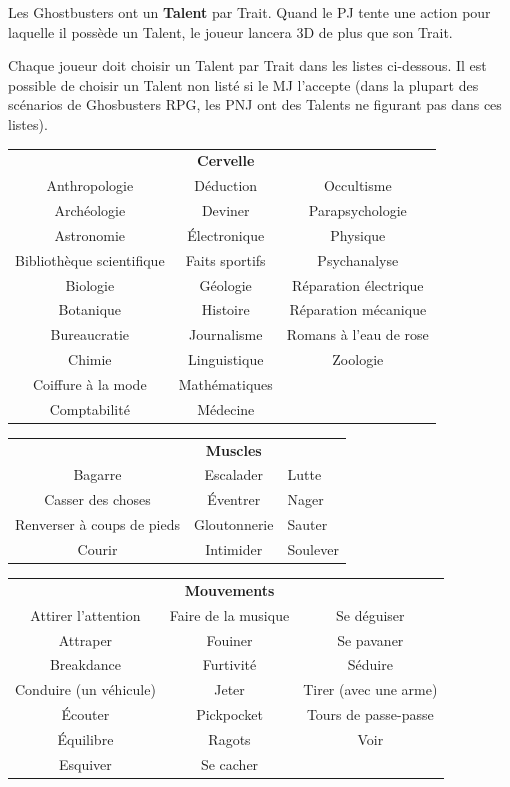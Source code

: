 \begin{frame}[b]
{

\myindent Les Ghostbusters ont un \textbf{Talent} par Trait. Quand le PJ tente une action pour laquelle il possède un Talent, le joueur lancera 3D de plus que son Trait.

\myindent Chaque joueur doit choisir un Talent par Trait dans les listes ci-dessous. Il est possible de choisir un Talent non listé si le MJ l'accepte (dans la plupart des scénarios de Ghosbusters RPG, les PNJ ont des Talents ne figurant pas dans ces listes).
}{
\begin{center}
\begin{tabular}{ccc}
&\textbf{Cervelle}&\\
Anthropologie & Déduction & Occultisme \\ 
Archéologie & Deviner & Parapsychologie \\
Astronomie & Électronique &  Physique \\ 
Bibliothèque scientifique & Faits sportifs & Psychanalyse \\ 
Biologie & Géologie & Réparation électrique \\
Botanique & Histoire & Réparation mécanique \\
Bureaucratie & Journalisme & Romans à l'eau de rose \\
Chimie & Linguistique & Zoologie \\
Coiffure à la mode & Mathématiques & \\
Comptabilité & Médecine & \\
\end{tabular}
\end{center}

\begin{center}
\begin{tabular}{cc>{\centering\arraybackslash}p{2.5cm}}
& \textbf{Muscles} &  \\
Bagarre & Escalader & Lutte \\
Casser des choses & Éventrer & Nager \\
Renverser à coups de pieds & Gloutonnerie & Sauter \\
Courir & Intimider & Soulever \\
\end{tabular}
\end{center}

\begin{center}
\begin{tabular}{ccc}
& \textbf{Mouvements} & \\
Attirer l'attention & Faire de la musique & Se déguiser \\
Attraper & Fouiner & Se pavaner \\
Breakdance & Furtivité & Séduire \\
Conduire (un véhicule) & Jeter & Tirer (avec une arme) \\
Écouter & Pickpocket & Tours de passe-passe \\
Équilibre & Ragots & Voir \\
Esquiver & Se cacher &  \\
\end{tabular}
\end{center}

}
\end{frame}
